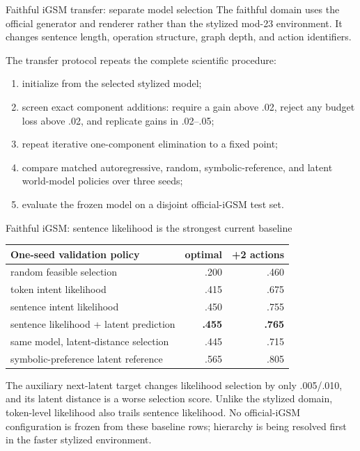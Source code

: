 \documentclass[aspectratio=169,10pt]{beamer}
\newcommand{\good}[1]{\textcolor{cgreen}{\textbf{#1}}}
\begin{document}
\begin{frame}{Faithful iGSM transfer: separate model selection}
\small
The faithful domain uses the official generator and renderer rather than the
stylized mod-23 environment. It changes sentence length, operation structure,
graph depth, and action identifiers.

\medskip
The transfer protocol repeats the complete scientific procedure:
\begin{enumerate}
\item initialize from the selected stylized model;
\item screen exact component additions: require a gain above .02, reject any
budget loss above .02, and replicate gains in .02--.05;
\item repeat iterative one-component elimination to a fixed point;
\item compare matched autoregressive, random, symbolic-reference, and latent
world-model policies over three seeds;
\item evaluate the frozen model on a disjoint official-iGSM test set.
\end{enumerate}
\end{frame}

\begin{frame}{Faithful iGSM: sentence likelihood is the strongest current baseline}
\small
\centering
\begin{tabular}{lrr}
\toprule
One-seed validation policy & optimal & +2 actions\\
\midrule
random feasible selection & .200 & .460\\
token intent likelihood & .415 & .675\\
sentence intent likelihood & .450 & .755\\
sentence likelihood + latent prediction & \good{.455} & \good{.765}\\
same model, latent-distance selection & .445 & .715\\
symbolic-preference latent reference & .565 & .805\\
\bottomrule
\end{tabular}

\medskip
\raggedright
The auxiliary next-latent target changes likelihood selection by only
.005/.010, and its latent distance is a worse selection score. Unlike the
stylized domain, token-level likelihood also trails sentence likelihood.
No official-iGSM configuration is frozen from these baseline rows; hierarchy
is being resolved first in the faster stylized environment.
\end{frame}
\end{document}
